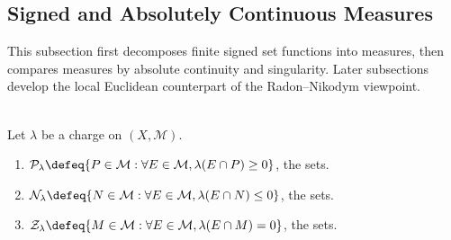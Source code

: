 \subsection{Signed and Absolutely Continuous Measures}

%

This subsection first decomposes finite signed set functions into measures, then compares measures by absolute continuity and singularity. Later subsections develop the local Euclidean counterpart of the Radon--Nikodym viewpoint.

\begin{definition} \label{def:positive-negative-null-sets-charge} \\
Let $\lambda$ be a charge on $(X,\mathcal{M})$.
\begin{enumerate}[label=(\roman*)]
\setlength{\itemsep}{0pt}
\item $\mathcal{P}_\lambda\defeq\{P\in\mathcal{M}:\forall E\in\mathcal{M},\lambda(E\cap P)\geq0\}$, the  sets.
\item $\mathcal{N}_\lambda\defeq\{N\in\mathcal{M}:\forall E\in\mathcal{M},\lambda(E\cap N)\leq0\}$, the  sets.
\item $\mathcal{Z}_\lambda\defeq\{M\in\mathcal{M}:\forall E\in\mathcal{M},\lambda(E\cap M)=0\}$, the  sets.
\end{enumerate}
\end{definition}

